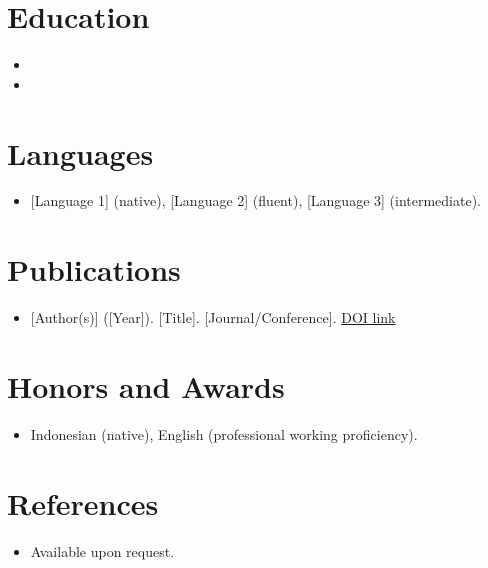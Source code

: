 \documentclass[11pt,a4paper,sans]{moderncv}
\begin{document}
\section{Education}
\begin{itemize}
\item{}
\item{}
\end{itemize}
\section{Languages}
\vspace{1pt}
\begin{itemize}
\item {[Language 1] (native), [Language 2] (fluent), [Language 3] (intermediate).}
\end{itemize}


\section{Publications}
\vspace{1pt}
\begin{itemize}
\item {[Author(s)] ([Year]). [Title]. [Journal/Conference]. \href{[DOI_URL]}{DOI link}}
\end{itemize}


\section{Honors and Awards}
\vspace{1pt}
\begin{itemize}
\item Indonesian (native), English (professional working proficiency).
\end{itemize}
\section{References}
\begin{itemize}
\item Available upon request.
\end{itemize}
\end{document}
